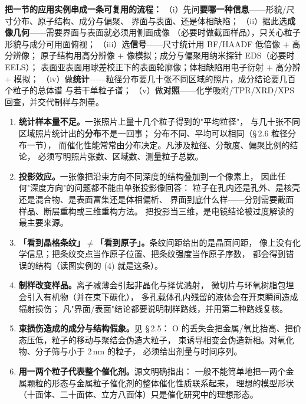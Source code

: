 \begin{dataflow}
\textbf{把一节的应用实例串成一条可复用的流程：}
（i）先问\textbf{要哪一种信息}——形貌/尺寸分布、原子结构、成分与偏聚、
界面与表面、还是体相缺陷；
（ii）据此选\textbf{成像几何}——需要界面与表面就必须用侧面成像
（必要时做截面样品），只关心粒子形貌与成分可用面俯视；
（iii）选\textbf{信号}——尺寸统计用 BF/HAADF 低倍像 $+$ 高分辨像；
原子结构用高分辨像 $+$ 像模拟；成分与偏聚用纳米探针 EDS（必要时 EELS）；
表面亚表面用球差校正下的表面轮廓像；体相缺陷用电子衍射 $+$ 高分辨 $+$ 模拟；
（iv）做\textbf{统计}——粒径分布要几十张不同区域的照片，成分结论要几百个粒子的总体谱
与若干单粒子谱；
（v）做\textbf{对照}——化学吸附/TPR/XRD/XPS 回查，并交代制样与剂量。
\end{dataflow}

\begin{pitfall}
\begin{enumerate}[leftmargin=1.6em]
\item \textbf{统计样本量不足。}一张照片上量十几个粒子得到的"平均粒径"，
与几十张不同区域照片统计出的\textbf{分布}不是一回事；
分布不同、平均可以相同（\S\,2.6 粒径分布一节），
而催化性能常常由分布决定。凡涉及粒径、分散度、偏聚比例的结论，
必须写明照片张数、区域数、测量粒子总数。
\item \textbf{投影效应。}一张像把沿束方向不同深度的结构叠加到一个像素上，
因此任何"深度方向"的问题都不能由单张投影像回答：
粒子在孔内还是孔外、是核壳还是混合物、是表面富集还是体相偏析、
界面到底什么样——分别需要截面样品、断层重构或三维重构方法。
把投影当三维，是电镜结论被过度解读的最主要来源。
\item \textbf{「看到晶格条纹」$\neq$「看到原子」。}条纹间距给出的是晶面间距，
像上没有化学信息；把条纹交点当作原子位置、把条纹强度当作原子序数，
都会得到错误的结构（读图实例的 (4) 就是这条）。
\item \textbf{制样改变样品。}离子减薄会引起非晶化与择优溅射，
微切片与环氧树脂包埋会引入有机物（并在束下碳化），
多孔载体孔内残留的液体会在开束瞬间造成辐射损伤；
凡"界面/表面"结论都要说明制样路线，并用第二种路线复核。
\item \textbf{束损伤造成的成分与结构假象。}见 \S\,2.5：
O 的丢失会把金属/氧比抬高、把价态压低，粒子的移动与聚结会伪造大粒子，
束诱导相变会伪造新相。对氧化物、分子筛与小于 2\,nm 的粒子，
必须给出剂量与时间序列。
\item \textbf{用一两个粒子代表整个催化剂。}源文明确指出：
一般不能简单地把一两个金属颗粒的形态与金属粒子催化剂的整体催化性质联系起来，
理想的模型形状（十面体、二十面体、立方八面体）只是催化研究中的理想形态。
\end{enumerate}
\end{pitfall}

